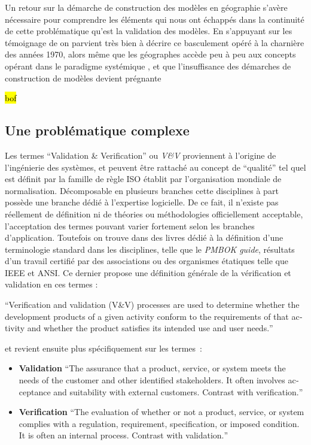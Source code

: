 Un retour sur la démarche de construction des modèles en géographie s'avère nécessaire pour comprendre les éléments qui nous ont échappés dans la continuité de cette problématique qu'est la validation des modèles. En s'appuyant sur les témoignage de \autocite{Batty2001, Pumain2003} on parvient très bien à décrire ce basculement opéré à la charnière des années 1970, alors même que les géographes accède peu à peu aux concepts opérant dans le paradigme systémique \autocite{Harvey1969}, et que l'insuffisance des démarches de construction de modèles devient prégnante 

\hl{bof}

\subsection{Une problématique complexe}

Les termes \foreignquote{english}{Validation \& Verification} ou \textit{V\&V} proviennent à l'origine de l'ingénierie des systèmes, et peuvent être rattaché au concept de \enquote{qualité} tel quel est définit par la famille de règle ISO établit par l'organisation mondiale de normalisation. Décomposable en plusieurs branches cette disciplines à part possède une branche dédié à l'expertise logicielle. De ce fait, il n'existe pas réellement de définition ni de théories ou méthodologies officiellement acceptable, l'acceptation des termes pouvant varier fortement selon les branches d'application. Toutefois on trouve dans des livres dédié à la définition d'une terminologie standard dans les disciplines, telle que le \textit{PMBOK guide}, résultats d'un travail certifié par des associations ou des organismes étatiques telle que IEEE et ANSI. Ce dernier propose une définition générale de la vérification et validation en ces termes : 

\foreignquote{english}{Verification and validation (V\&V) processes are used to determine whether the development products of a given activity conform to the requirements of that activity and whether the product satisfies its intended use and user needs.}

et revient ensuite plus spécifiquement sur les termes : 

\begin{itemize}
\item \textbf{Validation} \foreignquote{english}{The assurance that a product, service, or system meets the needs of the customer and other identified stakeholders. It often involves acceptance and suitability with external customers. Contrast with verification.}
\item \textbf{Verification} \foreignquote{english}{The evaluation of whether or not a product, service, or system complies with a regulation, requirement, specification, or imposed condition. It is often an internal process. Contrast with validation.}
\end{itemize}

